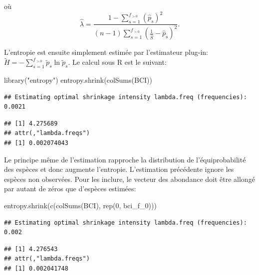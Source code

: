 \documentclass[
  11pt,
  american,
  a4paper,
  extrafontsizes,onecolumn,openright
  ]{memoir}
\newenvironment{Shaded}{\begin{snugshade}}{\end{snugshade}}
\newcommand{\DecValTok}[1]{\textcolor[rgb]{0.00,0.00,0.81}{#1}}
\newcommand{\FunctionTok}[1]{\textcolor[rgb]{0.00,0.00,0.00}{#1}}
\newcommand{\NormalTok}[1]{#1}
\newcommand{\StringTok}[1]{\textcolor[rgb]{0.31,0.60,0.02}{#1}}
\begin{document}
où
\begin{equation}
  \label{eq:JamesStein2}
  \hat{\lambda} = \frac
    {1 - \sum^{f_{>0}}_{s=1}{\left( \hat{p}_s \right)^2}}
    {\left( n - 1 \right) \sum^{f_{>0}}_{s=1}{\left( \frac{1}{\hat{S}} - \hat{p}_s \right)^2}}.
\end{equation}

L'entropie est ensuite simplement estimée par l'estimateur plug-in: \(\tilde{H} = -\sum^{f_{>0}}_{s=1}{\tilde{p}_s \ln{\tilde{p}_s}}\).
Le calcul sous R est le suivant:

\scriptsize

\begin{Shaded}
\begin{Highlighting}[]
\FunctionTok{library}\NormalTok{(}\StringTok{"entropy"}\NormalTok{)}
\FunctionTok{entropy.shrink}\NormalTok{(}\FunctionTok{colSums}\NormalTok{(BCI))}
\end{Highlighting}
\end{Shaded}

\begin{verbatim}
## Estimating optimal shrinkage intensity lambda.freq (frequencies): 0.0021
\end{verbatim}

\begin{verbatim}
## [1] 4.275689
## attr(,"lambda.freqs")
## [1] 0.002074043
\end{verbatim}

\normalsize

Le principe même de l'estimation rapproche la distribution de l'équiprobabilité des espèces et donc augmente l'entropie.
L'estimation précédente ignore les espèces non observées.
Pour les inclure, le vecteur des abondance doit être allongé par autant de zéros que d'espèces estimées:

\scriptsize

\begin{Shaded}
\begin{Highlighting}[]
\FunctionTok{entropy.shrink}\NormalTok{(}\FunctionTok{c}\NormalTok{(}\FunctionTok{colSums}\NormalTok{(BCI), }\FunctionTok{rep}\NormalTok{(}\DecValTok{0}\NormalTok{, bci\_f\_0)))}
\end{Highlighting}
\end{Shaded}

\begin{verbatim}
## Estimating optimal shrinkage intensity lambda.freq (frequencies): 0.002
\end{verbatim}

\begin{verbatim}
## [1] 4.276543
## attr(,"lambda.freqs")
## [1] 0.002041748
\end{verbatim}
\end{document}
